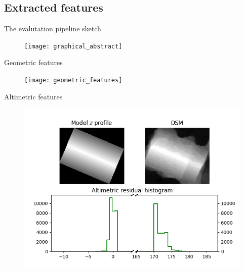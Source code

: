 \documentclass[export]{beamer}
\begin{document}
        \subsection{Extracted features}
            \begin{frame}{The evalutation pipeline sketch}
                \begin{figure}
                    \texttt{[image: graphical\_abstract]}
                \end{figure}
            \end{frame}
            \begin{frame}{Geometric features}
                \begin{figure}
                    \texttt{[image: geometric\_features]}
                \end{figure}
            \end{frame}
            \begin{frame}{Altimetric features}
                \begin{figure}
                    \includegraphics[height=.7\textheight]{images/altimetric_features}
                \end{figure}
            \end{frame}
\end{document}
